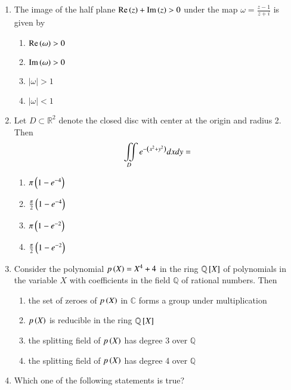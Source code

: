 \documentclass[journal]{IEEEtran}
\begin{document}
\begin{enumerate}
\item  The image of the half plane $\operatorname{Re}\left(z\right)+\operatorname{Im}\left(z\right)>0$ under the map $\omega=\frac{z-1}{z+i}$ is given by 
\begin{multicols}{4}
\begin{enumerate}
    \item $\operatorname{Re}\left(\omega\right)>0$
    \item $\operatorname{Im}\left(\omega\right)>0$
    \item $|\omega|>1$
    \item $|\omega|<1$
\end{enumerate}
\end{multicols}
\item Let $D \subset \mathbb{R}^2$ denote the closed disc with center at the origin and radius 2. Then
\begin{align*}
    \displaystyle \iint\limits_{D} e^{-\left(x^2+y^2\right)}dxdy=
\end{align*}
\begin{multicols}{4}
    \begin{enumerate}
        \item $\pi\left(1-e^{-4}\right)$
        \item $\frac{\pi}{2}\left(1-e^{-4}\right)$
        \item $\pi\left(1-e^{-2}\right)$
        \item $\frac{\pi}{2}\left(1-e^{-2}\right)$
    \end{enumerate}
\end{multicols}
\item Consider the polynomial $p\left(X\right)=X^4+4$ in the ring $\mathbb{Q}{}\left[X\right]$ of polynomials in the variable $X$ with coefficients in the field $\mathbb{Q}$ of rational numbers. Then
\begin{enumerate}
	\item the set of zeroes of $p\left(X\right)$ in $\mathbb{C}$ forms a group under multiplication
    \item $p\left(X\right)$ is reducible in the ring $\mathbb{Q}{}\left[X\right]$
    \item the splitting field of $p\left(X\right)$ has degree 3 over $\mathbb{Q}$
    \item the splitting field of $p\left(X\right)$ has degree 4 over $\mathbb{Q}$
\end{enumerate}
\item Which one of the following statements is true?
\begin{enumerate}

\end{enumerate}
\end{enumerate}
\end{document}
